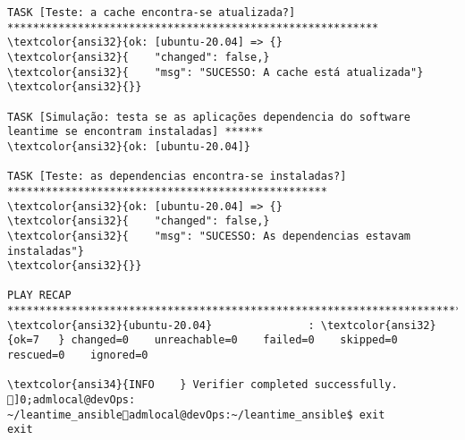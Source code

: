 \documentclass{scrartcl}
\begin{document}
\begin{Verbatim}
TASK [Teste: a cache encontra-se atualizada?] **********************************************************
\textcolor{ansi32}{ok: [ubuntu-20.04] => {}
\textcolor{ansi32}{    "changed": false,}
\textcolor{ansi32}{    "msg": "SUCESSO: A cache está atualizada"}
\textcolor{ansi32}{}}

TASK [Simulação: testa se as aplicações dependencia do software leantime se encontram instaladas] ******
\textcolor{ansi32}{ok: [ubuntu-20.04]}

TASK [Teste: as dependencias encontra-se instaladas?] **************************************************
\textcolor{ansi32}{ok: [ubuntu-20.04] => {}
\textcolor{ansi32}{    "changed": false,}
\textcolor{ansi32}{    "msg": "SUCESSO: As dependencias estavam instaladas"}
\textcolor{ansi32}{}}

PLAY RECAP *********************************************************************************************
\textcolor{ansi32}{ubuntu-20.04}               : \textcolor{ansi32}{ok=7   } changed=0    unreachable=0    failed=0    skipped=0    rescued=0    ignored=0

\textcolor{ansi34}{INFO    } Verifier completed successfully.
]0;admlocal@devOps: ~/leantime_ansibleadmlocal@devOps:~/leantime_ansible$ exit
exit

\end{Verbatim}
\end{document}

